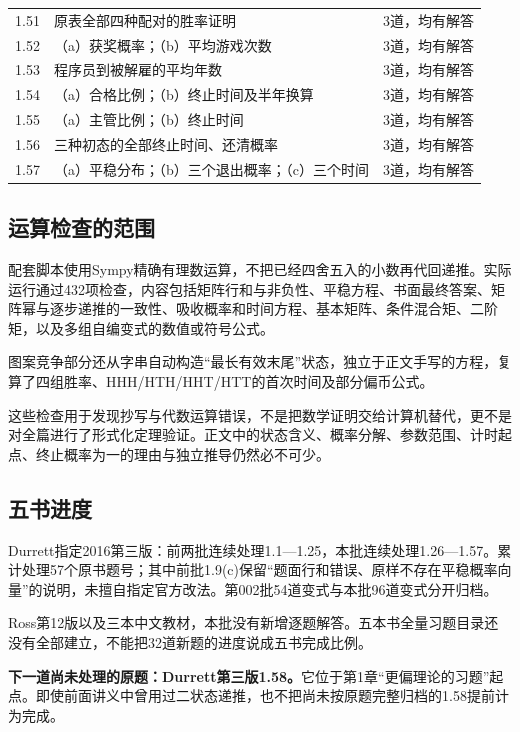 \documentclass[
  11pt,
  a4paper,
  UTF8,
  fontset=fandol]{ctexart}
\begin{document}
\begin{longtable}[]{@{}lll@{}}
1.51 & 原表全部四种配对的胜率证明 & 3道，均有解答 \\
1.52 & （a）获奖概率；（b）平均游戏次数 & 3道，均有解答 \\
1.53 & 程序员到被解雇的平均年数 & 3道，均有解答 \\
1.54 & （a）合格比例；（b）终止时间及半年换算 & 3道，均有解答 \\
1.55 & （a）主管比例；（b）终止时间 & 3道，均有解答 \\
1.56 & 三种初态的全部终止时间、还清概率 & 3道，均有解答 \\
1.57 & （a）平稳分布；（b）三个退出概率；（c）三个时间 &
3道，均有解答 \\
\end{longtable}

\subsection{运算检查的范围}\label{ux8fd0ux7b97ux68c0ux67e5ux7684ux8303ux56f4}

配套脚本使用Sympy精确有理数运算，不把已经四舍五入的小数再代回递推。实际运行通过432项检查，内容包括矩阵行和与非负性、平稳方程、书面最终答案、矩阵幂与逐步递推的一致性、吸收概率和时间方程、基本矩阵、条件混合矩、二阶矩，以及多组自编变式的数值或符号公式。

图案竞争部分还从字串自动构造``最长有效末尾''状态，独立于正文手写的方程，复算了四组胜率、HHH/HTH/HHT/HTT的首次时间及部分偏币公式。

这些检查用于发现抄写与代数运算错误，不是把数学证明交给计算机替代，更不是对全篇进行了形式化定理验证。正文中的状态含义、概率分解、参数范围、计时起点、终止概率为一的理由与独立推导仍然必不可少。

\subsection{五书进度}\label{ux4e94ux4e66ux8fdbux5ea6}

Durrett指定2016第三版：前两批连续处理1.1---1.25，本批连续处理1.26---1.57。累计处理57个原书题号；其中前批1.9(c)保留``题面行和错误、原样不存在平稳概率向量''的说明，未擅自指定官方改法。第002批54道变式与本批96道变式分开归档。

Ross第12版以及三本中文教材，本批没有新增逐题解答。五本书全量习题目录还没有全部建立，不能把32道新题的进度说成五书完成比例。

\textbf{下一道尚未处理的原题：Durrett第三版1.58。}它位于第1章``更偏理论的习题''起点。即使前面讲义中曾用过二状态递推，也不把尚未按原题完整归档的1.58提前计为完成。
\end{document}
